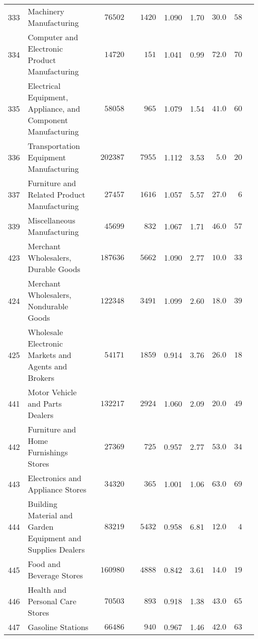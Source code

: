 \documentclass[9pt, oneside]{article}   	%
\begin{document}
\begin{longtable}{lp{3 in}ccccccc}
333  & Machinery Manufacturing & $\phantom{00}76502$ & $\phantom{00}1420$ & 1.090 &  1.70 & $30.0$ & $58$ \\
334  & Computer and Electronic Product Manufacturing & $\phantom{00}14720$ & $\phantom{000}151$ & 1.041 &  0.99 & $72.0$ & $70$ \\
335  & Electrical Equipment, Appliance, and Component Manufacturing & $\phantom{00}58058$ & $\phantom{000}965$ & 1.079 &  1.54 & $41.0$ & $60$ \\
336  & Transportation Equipment Manufacturing & $\phantom{0}202387$ & $\phantom{00}7955$ & 1.112 &  3.53 & $\phantom{0}5.0$ & $20$ \\
337  & Furniture and Related Product Manufacturing & $\phantom{00}27457$ & $\phantom{00}1616$ & 1.057 &  5.57 & $27.0$ & $\phantom{0}6$ \\
339  & Miscellaneous Manufacturing & $\phantom{00}45699$ & $\phantom{000}832$ & 1.067 &  1.71 & $46.0$ & $57$ \\
423  & Merchant Wholesalers, Durable Goods & $\phantom{0}187636$ & $\phantom{00}5662$ & 1.090 &  2.77 & $10.0$ & $33$ \\
424  & Merchant Wholesalers, Nondurable Goods & $\phantom{0}122348$ & $\phantom{00}3491$ & 1.099 &  2.60 & $18.0$ & $39$ \\
425  & Wholesale Electronic Markets and Agents and Brokers & $\phantom{00}54171$ & $\phantom{00}1859$ & 0.914 &  3.76 & $26.0$ & $18$ \\
441  & Motor Vehicle and Parts Dealers & $\phantom{0}132217$ & $\phantom{00}2924$ & 1.060 &  2.09 & $20.0$ & $49$ \\
442  & Furniture and Home Furnishings Stores & $\phantom{00}27369$ & $\phantom{000}725$ & 0.957 &  2.77 & $53.0$ & $34$ \\
443  & Electronics and Appliance Stores & $\phantom{00}34320$ & $\phantom{000}365$ & 1.001 &  1.06 & $63.0$ & $69$ \\
444  & Building Material and Garden Equipment and Supplies Dealers & $\phantom{00}83219$ & $\phantom{00}5432$ & 0.958 &  6.81 & $12.0$ & $\phantom{0}4$ \\
445  & Food and Beverage Stores & $\phantom{0}160980$ & $\phantom{00}4888$ & 0.842 &  3.61 & $14.0$ & $19$ \\
446  & Health and Personal Care Stores & $\phantom{00}70503$ & $\phantom{000}893$ & 0.918 &  1.38 & $43.0$ & $65$ \\
447  & Gasoline Stations & $\phantom{00}66486$ & $\phantom{000}940$ & 0.967 &  1.46 & $42.0$ & $63$ \\

\end{longtable}
\end{document}
